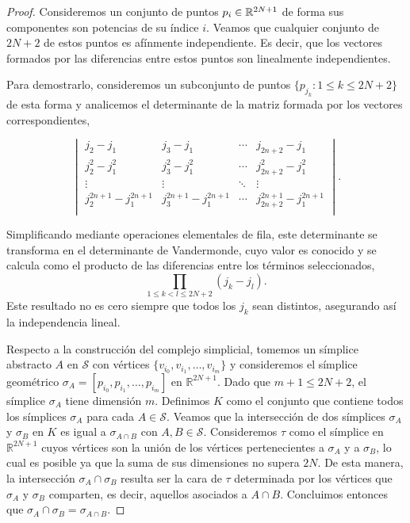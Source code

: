 \begin{proof}
	Consideremos un conjunto de puntos \(p_{i} \in \mathbb{R}^{2N+1}\) de forma sus componentes
	son potencias de su índice \(i\). Veamos que cualquier conjunto de \(2N+2\) de
	estos puntos es afínmente independiente. Es decir, que los vectores formados
	por las diferencias entre estos puntos son linealmente independientes.

	Para demostrarlo, consideremos un subconjunto de puntos \(\{p_{j_k}: 1 \leq k \leq
	2N+2\}\) de esta forma y analicemos el determinante de la matriz formada por los
	vectores correspondientes,

	\[
		\begin{vmatrix}
			j_{2}- j_{1}               & j_{3}- j_{1}               & \cdots & j_{2n+2}- j_{1}               \\
			j_{2}^{2}- j_{1}^{2}       & j_{3}^{2}- j_{1}^{2}       & \cdots & j_{2n+2}^{2}- j_{1}^{2}       \\
			\vdots                     & \vdots                     & \ddots & \vdots                        \\
			j_{2}^{2n+1}- j_{1}^{2n+1} & j_{3}^{2n+1}- j_{1}^{2n+1} & \cdots & j_{2n+2}^{2n+1}- j_{1}^{2n+1} \\
		\end{vmatrix}
		.
	\]

	Simplificando mediante operaciones elementales de fila, este determinante se transforma
	en el determinante de Vandermonde, cuyo valor es conocido y se calcula como el
	producto de las diferencias entre los términos seleccionados,
	\[
		\prod_{1 \leq k < l \leq 2N+2}(j_{k} - j_{l}).
	\]
	Este resultado no es cero siempre que todos los \(j_{k}\) sean distintos,
	asegurando así la independencia lineal.

	Respecto a la construcción del complejo simplicial, tomemos un símplice abstracto
	\(A\) en \(\mathcal{S}\) con vértices \(\{v_{i_0}, v_{i_1}, \ldots, v_{i_m}\}\) y consideremos
	el símplice geométrico \(\sigma_{A} = [p_{i_0}, p_{i_1}, \ldots, p_{i_m}]\) en \(\mathbb{R}
	^{2N+1}\). Dado que \(m+1 \leq 2N + 2\), el símplice \(\sigma_{A}\) tiene dimensión
	\(m\). Definimos \(K\) como el conjunto que contiene todos los símplices
	\(\sigma_{A}\) para cada \(A \in \mathcal{S}\). Veamos que la intersección de dos símplices
	\(\sigma_{A}\) y \(\sigma_{B}\) en \(K\) es igual a \(\sigma_{A \cap B}\) con \(A,B \in
	\mathcal{S}\). Consideremos \(\tau\) como el símplice en \(\mathbb{R}^{2N+1}\)
	cuyos vértices son la unión de los vértices pertenecientes a \(\sigma_{A}\) y a
	\(\sigma_{B}\), lo cual es posible ya que la suma de sus dimensiones no supera \(2
	N\). De esta manera, la intersección \(\sigma_{A}\cap \sigma_{B}\) resulta ser la
	cara de \(\tau\) determinada por los vértices que \(\sigma_{A}\) y \(\sigma_{B}\) comparten,
	es decir, aquellos asociados a \(A \cap B\). Concluimos entonces que
	\(\sigma_{A}\cap \sigma_{B}= \sigma_{A \cap B}\).
\end{proof}

